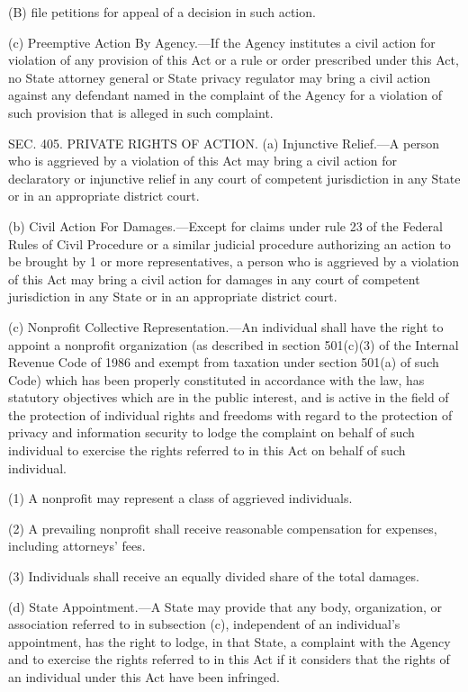 (B) file petitions for appeal of a decision in such action.

(c) Preemptive Action By Agency.—If the Agency institutes a civil action for violation of any provision of this Act or a rule or order prescribed under this Act, no State attorney general or State privacy regulator may bring a civil action against any defendant named in the complaint of the Agency for a violation of such provision that is alleged in such complaint.


SEC. 405. PRIVATE RIGHTS OF ACTION.
(a) Injunctive Relief.—A person who is aggrieved by a violation of this Act may bring a civil action for declaratory or injunctive relief in any court of competent jurisdiction in any State or in an appropriate district court.

(b) Civil Action For Damages.—Except for claims under rule 23 of the Federal Rules of Civil Procedure or a similar judicial procedure authorizing an action to be brought by 1 or more representatives, a person who is aggrieved by a violation of this Act may bring a civil action for damages in any court of competent jurisdiction in any State or in an appropriate district court.

(c) Nonprofit Collective Representation.—An individual shall have the right to appoint a nonprofit organization (as described in section 501(c)(3) of the Internal Revenue Code of 1986 and exempt from taxation under section 501(a) of such Code) which has been properly constituted in accordance with the law, has statutory objectives which are in the public interest, and is active in the field of the protection of individual rights and freedoms with regard to the protection of privacy and information security to lodge the complaint on behalf of such individual to exercise the rights referred to in this Act on behalf of such individual.

(1) A nonprofit may represent a class of aggrieved individuals.

(2) A prevailing nonprofit shall receive reasonable compensation for expenses, including attorneys’ fees.

(3) Individuals shall receive an equally divided share of the total damages.

(d) State Appointment.—A State may provide that any body, organization, or association referred to in subsection (c), independent of an individual’s appointment, has the right to lodge, in that State, a complaint with the Agency and to exercise the rights referred to in this Act if it considers that the rights of an individual under this Act have been infringed.


